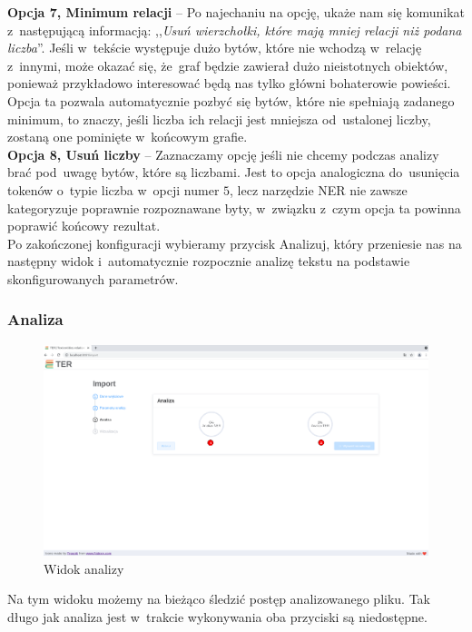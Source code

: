 \documentclass[12pt, a4paper]{article}
\begin{document}
\noindent\textbf{Opcja 7, Minimum relacji} -- Po najechaniu na opcję, ukaże nam się komunikat z~następującą informacją: ,,\textit{Usuń wierzchołki, które mają mniej relacji niż podana liczba}''. Jeśli w~tekście występuje dużo bytów, które nie wchodzą w~relację z~innymi, może okazać się, że~graf będzie zawierał dużo nieistotnych obiektów, ponieważ przykładowo interesować będą nas tylko główni bohaterowie powieści. Opcja ta pozwala automatycznie pozbyć się bytów, które nie spełniają zadanego minimum, to znaczy, jeśli liczba ich relacji jest mniejsza od~ustalonej liczby, zostaną one pominięte w~końcowym grafie.\\

\noindent\textbf{Opcja 8, Usuń liczby} -- Zaznaczamy opcję jeśli nie chcemy podczas analizy brać pod~uwagę bytów, które są liczbami. Jest to opcja analogiczna do~usunięcia tokenów o~typie liczba w~opcji numer $5$, lecz narzędzie NER nie zawsze kategoryzuje poprawnie rozpoznawane byty, w~związku z~czym opcja ta powinna poprawić końcowy rezultat.\\

Po zakończonej konfiguracji wybieramy przycisk Analizuj, który przeniesie nas na następny widok i~automatycznie rozpocznie analizę tekstu na podstawie skonfigurowanych parametrów.


\subsubsection{Analiza}

\begin{figure}[H]
  \centering
  \includegraphics[width=\linewidth]{images/analiza.png}
  \caption{Widok analizy}
\end{figure}

Na tym widoku możemy na bieżąco śledzić postęp analizowanego pliku. Tak długo jak analiza jest w~trakcie wykonywania oba przyciski są niedostępne.\\
\end{document}
